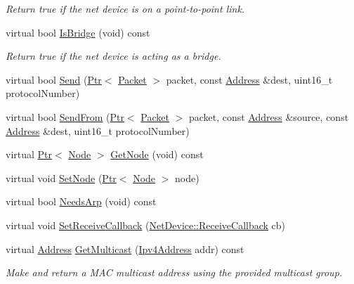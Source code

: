 \begin{DoxyCompactItemize}
\begin{DoxyCompactList}\small\item\em Return true if the net device is on a point-\/to-\/point link. \end{DoxyCompactList}\item 
virtual bool \hyperlink{classns3_1_1AlohaNoackNetDevice_af8606db44551e9281f379d16808a8ef2}{Is\+Bridge} (void) const 
\begin{DoxyCompactList}\small\item\em Return true if the net device is acting as a bridge. \end{DoxyCompactList}\item 
virtual bool \hyperlink{classns3_1_1AlohaNoackNetDevice_aa5fb8d99bbcfade79b07ff3117dadd41}{Send} (\hyperlink{classns3_1_1Ptr}{Ptr}$<$ \hyperlink{classns3_1_1Packet}{Packet} $>$ packet, const \hyperlink{classns3_1_1Address}{Address} \&dest, uint16\+\_\+t protocol\+Number)
\item 
virtual bool \hyperlink{classns3_1_1AlohaNoackNetDevice_ad8ce59285f5bcbab9ceaef2d551e3087}{Send\+From} (\hyperlink{classns3_1_1Ptr}{Ptr}$<$ \hyperlink{classns3_1_1Packet}{Packet} $>$ packet, const \hyperlink{classns3_1_1Address}{Address} \&source, const \hyperlink{classns3_1_1Address}{Address} \&dest, uint16\+\_\+t protocol\+Number)
\item 
virtual \hyperlink{classns3_1_1Ptr}{Ptr}$<$ \hyperlink{classns3_1_1Node}{Node} $>$ \hyperlink{classns3_1_1AlohaNoackNetDevice_ad073edd267b69bf947c828bf5997c888}{Get\+Node} (void) const 
\item 
virtual void \hyperlink{classns3_1_1AlohaNoackNetDevice_a52612a7a5f347f8389c3d014b2925d9c}{Set\+Node} (\hyperlink{classns3_1_1Ptr}{Ptr}$<$ \hyperlink{classns3_1_1Node}{Node} $>$ node)
\item 
virtual bool \hyperlink{classns3_1_1AlohaNoackNetDevice_af9d3d21d4cd356776b0260f543bc8288}{Needs\+Arp} (void) const 
\item 
virtual void \hyperlink{classns3_1_1AlohaNoackNetDevice_aec27316cc8643882df51d024ee44c64d}{Set\+Receive\+Callback} (\hyperlink{classns3_1_1NetDevice_ad5e5e1ca187472bc2ba99575d8def568}{Net\+Device\+::\+Receive\+Callback} cb)
\item 
virtual \hyperlink{classns3_1_1Address}{Address} \hyperlink{classns3_1_1AlohaNoackNetDevice_afcc79faa79df56f367d7e138889b7e40}{Get\+Multicast} (\hyperlink{classns3_1_1Ipv4Address}{Ipv4\+Address} addr) const 
\begin{DoxyCompactList}\small\item\em Make and return a M\+AC multicast address using the provided multicast group. \end{DoxyCompactList}\item 

\end{DoxyCompactItemize}
